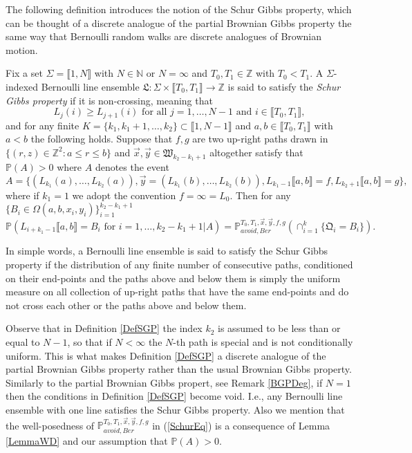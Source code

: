 The following definition introduces the notion of the Schur Gibbs property, which can be thought of a discrete analogue of the partial Brownian Gibbs property the same way that Bernoulli random walks are discrete analogues of Brownian motion. 
\begin{definition}\label{DefSGP}
Fix a set $\Sigma = \llbracket 1, N \rrbracket$ with $N \in \mathbb{N}$ or $N = \infty$ and $T_0, T_1\in \mathbb{Z}$ with $T_0 < T_1$. A $\Sigma$-indexed Bernoulli line ensemble $\mathfrak{L} : \Sigma \times \llbracket T_0, T_1 \rrbracket \rightarrow \mathbb{Z}$ is said to satisfy the {\em Schur Gibbs property} if it is non-crossing, meaning that 
$$ L_j(i) \geq L_{j+1}(i) \mbox{ for all $j = 1, \dots, N-1$ and $i \in \llbracket T_0, T_1 \rrbracket$},$$
and for any finite $K = \{k_1, k_1 + 1, \dots, k_2 \} \subset \llbracket 1, N - 1 \rrbracket$ and $a,b \in \llbracket T_0, T_1 \rrbracket$ with $a < b$ the following holds.  Suppose that $f, g$ are two up-right paths drawn in $\{ (r,z) \in \mathbb{Z}^2 : a \leq r \leq b\}$ and $\vec{x}, \vec{y} \in \mathfrak{W}_{k_2 - k_1 + 1}$ altogether satisfy that $\mathbb{P}(A) > 0$ where $A$ denotes the event
$$A =\{  ({L}_{k_1}(a), \dots, {L}_{k_2}(a)), \vec{y} = ({L}_{k_1}(b), \dots, {L}_{k_2}(b)), L_{k_1-1} \llbracket a,b \rrbracket = f, L_{k_2+1} \llbracket a,b \rrbracket = g \},$$
where if $k_1 = 1$ we adopt the convention $f = \infty = L_0$. Then for any $\{ B_i \in \Omega(a, b, x_i , y_i) \}_{i = 1}^{k_2 - k_1 +1}$ 
\begin{equation}\label{SchurEq}
\mathbb{P}\left( L_{i + k_1-1}\llbracket a,b \rrbracket = B_{i} \mbox{ for $i = 1, \dots, k_2 - k_1 + 1$} \vert  A \right) = \mathbb{P}_{avoid, Ber}^{T_0,T_1, \vec{x}, \vec{y}, f, g} \left( \cap_{i = 1}^k\{ \mathfrak{Q}_i = B_i \} \right).
\end{equation}
\end{definition}
\begin{remark}\label{RemSGB} In simple words, a Bernoulli line ensemble is said to satisfy the Schur Gibbs property if the distribution of any finite number of consecutive paths, conditioned on their end-points and the paths above and below them is simply the uniform measure on all collection of up-right paths that have the same end-points and do not cross each other or the paths above and below them. 
\end{remark}

\begin{remark}\label{RemSGB2} Observe that in Definition \ref{DefSGP} the index $k_2$ is assumed to be less than or equal to $N-1$, so that if $N < \infty$ the $N$-th path is special and is not conditionally uniform. This is what makes Definition \ref{DefSGP} a discrete analogue of the partial Brownian Gibbs property rather than the usual Brownian Gibbs property. Similarly to the partial Brownian Gibbs propert, see Remark \ref{BGPDeg}, if $N = 1$ then the conditions in Definition \ref{DefSGP} become void. I.e., any Bernoulli line ensemble with one line satisfies the Schur Gibbs property. Also we mention that the well-posedness of $\mathbb{P}_{avoid, Ber}^{T_0,T_1, \vec{x}, \vec{y}, f, g}$ in (\ref{SchurEq}) is a consequence of Lemma \ref{LemmaWD} and our assumption that $\mathbb{P}(A) > 0$.
\end{remark}


